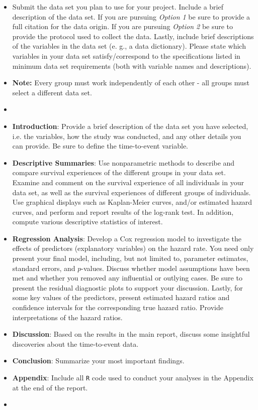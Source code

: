\documentclass[letterpaper,12pt]{report}
\begin{document}
\begin{itemize}
\item[] Submit the data set you plan to use for your project.  Include a brief description of the data set.  If you are pursuing \emph{Option 1} be sure to provide a full citation for the data origin.  If you are pursuing \emph{Option 2} be sure to provide the protocol used to collect the data.  Lastly, include brief descriptions of the variables in the data set (e. g., a data dictionary).  Please state which variables in your data set satisfy/correspond to the specifications listed in minimum data set requirements (both with variable names and descriptions).
\item[] \textbf{Note:} Every group must work independently of each other - all groups must select a different data set.
\item[]
\end{itemize}


{}
\begin{itemize}
\item \textbf{Introduction}: Provide a brief description of the data set you have selected, i.e.
the variables, how the study was conducted, and any other details you can provide. Be sure to define the time-to-event variable.
\item \textbf{Descriptive Summaries}: Use nonparametric methods to describe and compare survival experiences of the different groups in your data set. Examine and comment on the survival experience of all individuals in your data set, as well as the survival experiences of different groups of individuals. Use graphical displays such as Kaplan-Meier curves, and/or estimated hazard curves, and perform and report results of the log-rank test. In addition, compute various descriptive statistics of interest.
\item \textbf{Regression Analysis}: Develop a Cox regression model to investigate the effects of predictors (explanatory variables) on the hazard rate. You need only present your final model, including, but not limited to, parameter estimates, standard errors, and $p$-values. Discuss whether model assumptions have been met and whether you removed any influential or outlying cases.  Be sure to present the residual diagnostic plots to support your discussion.  Lastly, for some key values of
the predictors, present estimated hazard ratios and confidence intervals for the corresponding true hazard ratio. Provide
interpretations of the hazard ratios.
\item \textbf{Discussion}: Based on the results in the main report, discuss some insightful discoveries about the time-to-event data.
\item \textbf{Conclusion}: Summarize your most important findings.
\item \textbf{Appendix}:  Include all \texttt{R} code used to conduct your
analyses in the Appendix at the end of the report.
\item[]
\end{itemize}
\end{document}
